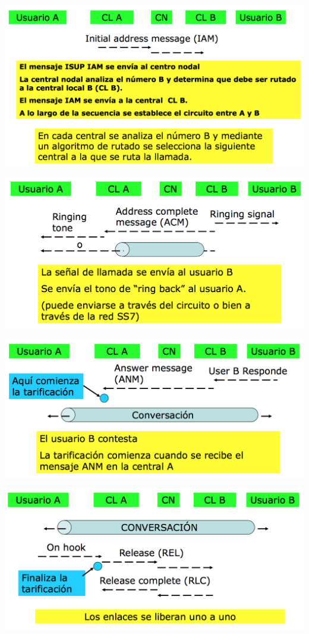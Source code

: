 \documentclass[10pt,portrait, twocolumn]{article}
\begin{document}
	\begin{center}
		\includegraphics[scale = 0.3]{rtb2}
	\end{center}
	
	\begin{center}
		\includegraphics[scale = 0.3]{rtb3}
	\end{center}
	
	\begin{center}
		\includegraphics[scale = 0.3]{rtb4}
	\end{center}
	
	\begin{center}
		\includegraphics[scale = 0.3]{rtb5}
	\end{center}
\end{document}
